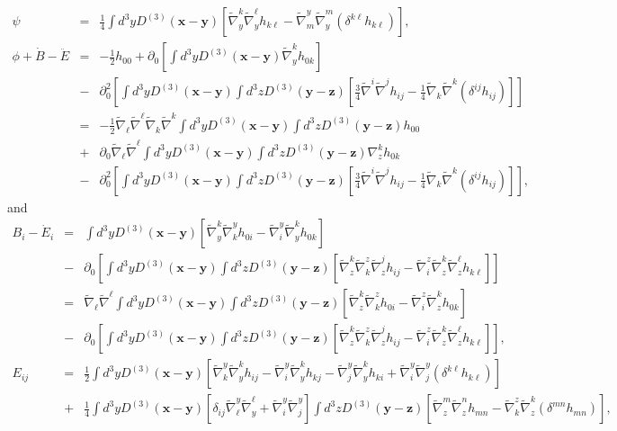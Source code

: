 \documentclass[aps,onecolumn,10pt]{revtex4}
\numberwithin{equation}{section}
\numberwithin{equation}{section}
\begin{document}
%
\begin{eqnarray}
\psi&=&\frac{1}{4}\int d^3yD^{(3)}(\mathbf{x}-\mathbf{y})\left[\tilde{\nabla}_y^k \tilde{\nabla}_y^{\ell}h_{k\ell}-\tilde{\nabla}^y_m\tilde{\nabla}_y^m(\delta^{k\ell}h_{k\ell})\right],
\nonumber\\
\phi+\dot{B}-\ddot{E}&=&-\frac{1}{2} h_{00}
+\partial_0\left[\int d^3y D^{(3)}(\mathbf x - \mathbf y) \tilde\nabla^k_y h_{0k}\right]
\nonumber\\
&-&\partial_0^2\left[\int d^3y D^{(3)}(\mathbf x - \mathbf y) \int d^3z D^{(3)}(\mathbf y - \mathbf z)
\left[ \frac{3}{4} \tilde{\nabla}^i \tilde{\nabla}^jh_{ij}-\frac{1}{4}\tilde{\nabla}_k\tilde{\nabla}^k(\delta^{ij}h_{ij})
\right]\right]
\nonumber\\
&=&-\tfrac{1}{2}\tilde{\nabla}_{\ell}\tilde{\nabla}^{\ell} \tilde{\nabla}_k\tilde{\nabla}^k\int d^3y D^{(3)}(\mathbf x - \mathbf y) \int d^3z D^{(3)}(\mathbf y - \mathbf z)h_{00}
\nonumber\\
&+&\partial_0\tilde{\nabla}_{\ell}\tilde{\nabla}^{\ell}\int d^3y D^{(3)}(\mathbf x - \mathbf y) \int d^3z D^{(3)}(\mathbf y - \mathbf z)\nabla^k_z h_{0k}
\nonumber\\
&-&\partial_0^2\left[\int d^3y D^{(3)}(\mathbf x - \mathbf y) \int d^3z D^{(3)}(\mathbf y - \mathbf z)
\left[ \frac{3}{4} \tilde{\nabla}^i \tilde{\nabla}^jh_{ij}-\frac{1}{4}\tilde{\nabla}_k\tilde{\nabla}^k(\delta^{ij}h_{ij})
\right]\right],
\label{2.7}
\end{eqnarray}
%
and 
%
\begin{eqnarray}
B_i -\dot{E}_i&=& \int d^3y D^{(3)}(\mathbf x - \mathbf y)\left[ \tilde\nabla^k_y \tilde\nabla_k^y h_{0i}
- \tilde\nabla_i^y \tilde\nabla^k_y h_{0k} \right]
\nonumber\\
&-&\partial_0\left[\int d^3y D^{(3)}(\mathbf x - \mathbf y) \int d^3z D^{(3)}(\mathbf y - \mathbf z)
\left[ \tilde\nabla^k_z \tilde\nabla_k^z \tilde\nabla^j_z h_{ij}-\tilde\nabla_i^z \tilde\nabla^k_z \tilde\nabla^{\ell}_z h_{k\ell}\right]\right]
\nonumber\\
&=&\tilde{\nabla}_{\ell}\tilde{\nabla}^{\ell} \int d^3y D^{(3)}(\mathbf x - \mathbf y) \int d^3z D^{(3)}(\mathbf y - \mathbf z)\left[ \tilde\nabla^k_z \tilde\nabla_k^z h_{0i}
- \tilde\nabla_i^z \tilde\nabla^k_z h_{0k} \right]
\nonumber\\
&-&\partial_0\left[\int d^3y D^{(3)}(\mathbf x - \mathbf y) \int d^3z D^{(3)}(\mathbf y - \mathbf z)
\left[ \tilde\nabla^k_z \tilde\nabla_k^z \tilde\nabla^j_z h_{ij}-\tilde\nabla_i^z \tilde\nabla^k_z \tilde\nabla^{\ell}_z h_{k\ell}\right]\right],
\nonumber\\
E_{ij}&=&\frac{1}{2}\int d^3yD^{(3)}(\mathbf{x}-\mathbf{y})\left[\tilde{\nabla}^y_k\tilde{\nabla}_y^kh_{ij}-\tilde{\nabla}^y_i\tilde{\nabla}_y^kh_{kj}-\tilde{\nabla}^y_j\tilde{\nabla}_y^kh_{ki}+\tilde{\nabla}^y_i\tilde{\nabla}^y_j(\delta^{k\ell}h_{k\ell})\right]
\nonumber\\
&+&\frac{1}{4}\int d^3yD^{(3)}(\mathbf{x}-\mathbf{y})\left[\delta_{ij}\tilde{\nabla}^y_{\ell}\tilde{\nabla}_y^{\ell}+\tilde{\nabla}^y_i\tilde{\nabla}^y_j\right]\int d^3zD^{(3)}(\mathbf{y}-\mathbf{z})\left[\tilde{\nabla}_z^m \tilde{\nabla}_z^{n}h_{mn}-\tilde{\nabla}^z_k\tilde{\nabla}_z^k(\delta^{mn}h_{mn})\right],
\label{2.8}
\end{eqnarray}
\end{document}
